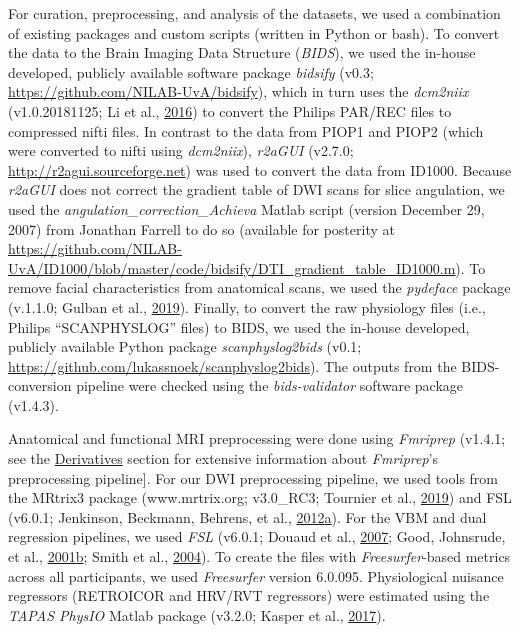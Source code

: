 \documentclass[11pt,american,]{memoir} %
\begin{document}
For curation, preprocessing, and analysis of the datasets, we used a combination of existing packages and custom scripts (written in Python or bash). To convert the data to the Brain Imaging Data Structure (\emph{BIDS}), we used the in-house developed, publicly available software package \emph{bidsify} (v0.3; \url{https://github.com/NILAB-UvA/bidsify}), which in turn uses the \emph{dcm2niix} (v1.0.20181125; Li et al., \protect\hyperlink{ref-Li2016-ss}{2016}) to convert the Philips PAR/REC files to compressed nifti files. In contrast to the data from PIOP1 and PIOP2 (which were converted to nifti using \emph{dcm2niix}), \emph{r2aGUI} (v2.7.0; \url{http://r2agui.sourceforge.net}) was used to convert the data from ID1000. Because \emph{r2aGUI} does not correct the gradient table of DWI scans for slice angulation, we used the \emph{angulation\_correction\_Achieva} Matlab script (version December 29, 2007) from Jonathan Farrell to do so (available for posterity at \url{https://github.com/NILAB-UvA/ID1000/blob/master/code/bidsify/DTI_gradient_table_ID1000.m}). To remove facial characteristics from anatomical scans, we used the \emph{pydeface} package (v.1.1.0; Gulban et al., \protect\hyperlink{ref-Gulban2019-sv}{2019}). Finally, to convert the raw physiology files (i.e., Philips ``SCANPHYSLOG'' files) to BIDS, we used the in-house developed, publicly available Python package \emph{scanphyslog2bids} (v0.1; \url{https://github.com/lukassnoek/scanphyslog2bids}). The outputs from the BIDS-conversion pipeline were checked using the \emph{bids-validator} software package (v1.4.3).

Anatomical and functional MRI preprocessing were done using \emph{Fmriprep} (v1.4.1; see the \protect\hyperlink{aomic-derivatives}{Derivatives} section for extensive information about \emph{Fmriprep}'s preprocessing pipeline{]}. For our DWI preprocessing pipeline, we used tools from the MRtrix3 package (www.mrtrix.org; v3.0\_RC3; Tournier et al., \protect\hyperlink{ref-Tournier2019-hh}{2019}) and FSL (v6.0.1; Jenkinson, Beckmann, Behrens, et al., \protect\hyperlink{ref-Jenkinson2012-ui}{2012}\protect\hyperlink{ref-Jenkinson2012-ui}{a}). For the VBM and dual regression pipelines, we used \emph{FSL} (v6.0.1; Douaud et al., \protect\hyperlink{ref-Douaud2007-sw}{2007}; Good, Johnsrude, et al., \protect\hyperlink{ref-Good2001-kv}{2001}\protect\hyperlink{ref-Good2001-kv}{b}; Smith et al., \protect\hyperlink{ref-Smith2004-sc}{2004}). To create the files with \emph{Freesurfer}-based metrics across all participants, we used \emph{Freesurfer} version 6.0.095. Physiological nuisance regressors (RETROICOR and HRV/RVT regressors) were estimated using the \emph{TAPAS PhysIO} Matlab package (v3.2.0; Kasper et al., \protect\hyperlink{ref-Kasper2017-lp}{2017}).
\end{document}
